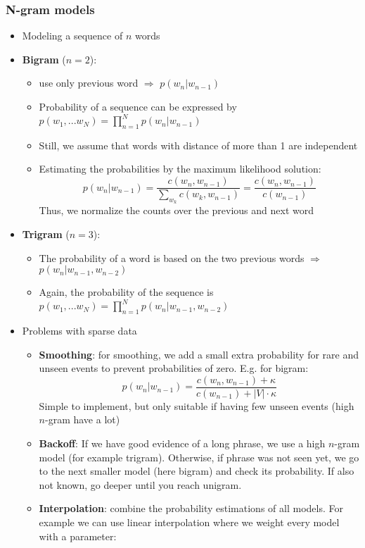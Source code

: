 \subsubsection{N-gram models}
\begin{itemize}
	\item Modeling a sequence of $n$ words
	\item \textbf{Bigram} ($n=2$): 
	\begin{itemize}
		\item use only previous word $\Rightarrow$ $p(w_n|w_{n-1})$
		\item Probability of a sequence can be expressed by $p(w_1,...w_N)=\prod\limits_{n=1}^{N} p(w_n|w_{n-1})$
		\item Still, we assume that words with distance of more than 1 are independent
		\item Estimating the probabilities by the maximum likelihood solution: $$p(w_n|w_{n-1})=\frac{c(w_n, w_{n-1})}{\sum_{w_k} c(w_k, w_{n-1})}=\frac{c(w_n, w_{n-1})}{c(w_{n-1})}$$
		Thus, we normalize the counts over the previous and next word
	\end{itemize}
	\item \textbf{Trigram} ($n=3$):
	\begin{itemize}
		\item The probability of a word is based on the two previous words $\Rightarrow$ $p(w_n|w_{n-1},w_{n-2})$
		\item Again, the probability of the sequence is $p(w_1,...w_N)=\prod\limits_{n=1}^{N} p(w_n|w_{n-1},w_{n-2})$
	\end{itemize}
	\item Problems with sparse data
	\begin{itemize}
		\item \textbf{Smoothing}: for smoothing, we add a small extra probability for rare and unseen events to prevent probabilities of zero. E.g. for bigram:
		$$p(w_n|w_{n-1})=\frac{c(w_n, w_{n-1}) + \kappa}{c(w_{n-1}) + |V|\cdot \kappa }$$
		Simple to implement, but only suitable if having few unseen events (high $n$-gram have a lot)
		\item \textbf{Backoff}: If we have good evidence of a long phrase, we use a high $n$-gram model (for example trigram). Otherwise, if phrase was not seen yet, we go to the next smaller model (here bigram) and check its probability. If also not known, go deeper until you reach unigram.
		\item \textbf{Interpolation}: combine the probability estimations of all models. For example we can use linear interpolation where we weight every model with a parameter:

\end{itemize}
\end{itemize}
